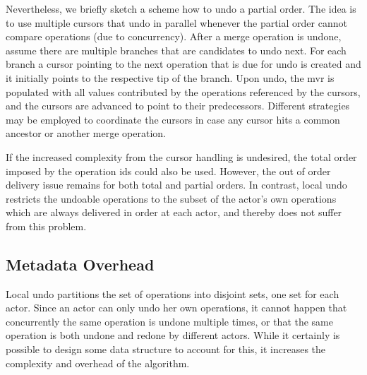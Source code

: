 \documentclass[sigplan,natbib=false,review]{acmart}
\begin{document}
Nevertheless, we briefly sketch a scheme how to undo a partial order.
The idea is to use multiple cursors that undo in parallel whenever the
partial order cannot compare operations (due to concurrency).
After a merge operation is undone, assume there are multiple branches
that are candidates to undo next.
For each branch a cursor pointing to the next operation that is due for undo
is created and it initially points to the respective tip of the branch.
Upon undo, the \gls{mvr} is populated with all values contributed by the
operations referenced by the cursors, and the cursors are advanced
to point to their predecessors.
Different strategies may be employed to coordinate the cursors in case
any cursor hits a common ancestor or another merge operation.

If the increased complexity from the cursor handling is undesired,
the total order imposed by the operation ids could also be used.
However, the out of order delivery issue remains for both total and
partial orders.
In contrast, local undo restricts the undoable operations to the subset of
the actor's own operations which are always delivered in order at each actor,
and thereby does not suffer from this problem.

\subsection{Metadata Overhead}

Local undo partitions the set of operations into disjoint sets,
one set for each actor.
Since an actor can only undo her own operations,
it cannot happen that concurrently the same operation is undone multiple times,
or that the same operation is both undone and redone by different actors.
While it certainly is possible to design some data structure to account for this,
it increases the complexity and overhead of the algorithm.
\end{document}
